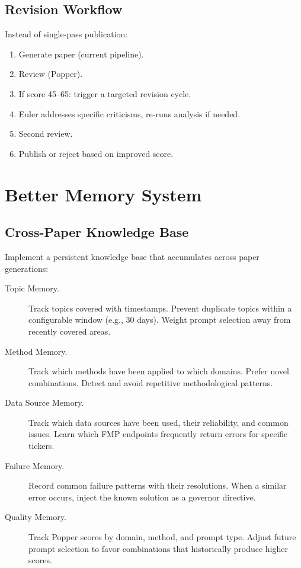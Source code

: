 \subsection{Revision Workflow}

Instead of single-pass publication:
\begin{enumerate}
  \item Generate paper (current pipeline).
  \item Review (Popper).
  \item If score 45--65: trigger a targeted revision cycle.
  \item Euler addresses specific criticisms, re-runs analysis if needed.
  \item Second review.
  \item Publish or reject based on improved score.
\end{enumerate}

\section{Better Memory System}
\label{sec:improve:memory}

\subsection{Cross-Paper Knowledge Base}

Implement a persistent knowledge base that accumulates across paper generations:

\begin{description}
  \item[Topic Memory.] Track topics covered with timestamps. Prevent duplicate topics within a configurable window (e.g., 30 days). Weight prompt selection away from recently covered areas.

  \item[Method Memory.] Track which methods have been applied to which domains. Prefer novel combinations. Detect and avoid repetitive methodological patterns.

  \item[Data Source Memory.] Track which data sources have been used, their reliability, and common issues. Learn which FMP endpoints frequently return errors for specific tickers.

  \item[Failure Memory.] Record common failure patterns with their resolutions. When a similar error occurs, inject the known solution as a governor directive.

  \item[Quality Memory.] Track Popper scores by domain, method, and prompt type. Adjust future prompt selection to favor combinations that historically produce higher scores.
\end{description}

